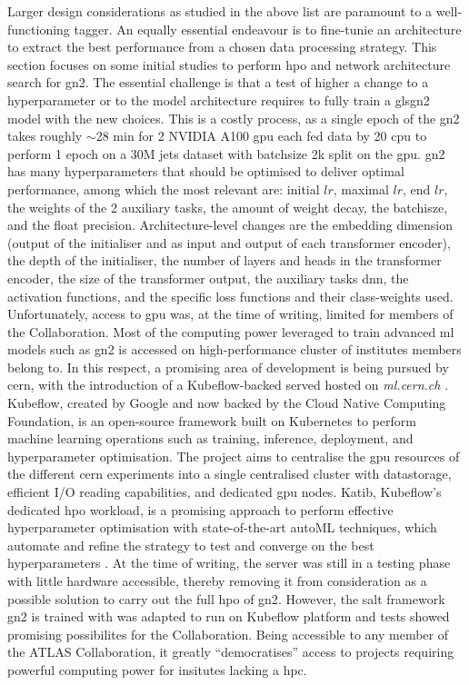 Larger design considerations as studied in the above list are paramount to a well-functioning tagger. An equally essential endeavour is to fine-tunie an architecture to extract the best performance from a chosen data processing strategy. This section focuses on some initial studies to perform \gls{hpo} and network architecture search for \gls{gn2}. The essential challenge is that a test of higher a change to a hyperparameter or to the model architecture requires to fully train a gls{gn2} model with the new choices. This is a costly process, as a single epoch of the \gls{gn2} takes roughly $\sim$28 min for 2 NVIDIA A100 \gls{gpu} each fed data by 20 \gls{cpu} to perform 1 epoch on a 30M jets dataset with batchsize 2k split on the \gls{gpu}. \gls{gn2} has many hyperparameters that should be optimised to deliver optimal performance, among which the most relevant are: initial $lr$, maximal $lr$, end $lr$, the weights of the 2 auxiliary tasks, the amount of weight decay, the batchisze, and the float precision. Architecture-level changes are the embedding dimension (output of the initialiser and as input and output of each transformer encoder), the depth of the initialiser, the number of layers and heads in the transformer encoder, the size of the transformer output, the auxiliary tasks \gls{dnn}, the activation functions, and the specific loss functions and their class-weights used. \\

Unfortunately, access to \gls{gpu} was, at the time of writing, limited for members of the Collaboration. Most of the computing power leveraged to train advanced \gls{ml} models such as \gls{gn2} is accessed on high-performance cluster of institutes members belong to. In this respect, a promising area of development is being pursued by \gls{cern}, with the introduction of a Kubeflow-backed served hosted on \textit{ml.cern.ch} \cite{KubeflowCern}. Kubeflow, created by Google and now backed by the Cloud Native Computing Foundation, is an open-source framework built on Kubernetes to perform machine learning operations such as training, inference, deployment, and hyperparameter optimisation. The project aims to centralise the \gls{gpu} resources of the different \gls{cern} experiments into a single centralised cluster with datastorage, efficient I/O reading capabilities, and dedicated \gls{gpu} nodes. Katib, Kubeflow's dedicated \gls{hpo} workload, is a promising approach to perform effective hyperparameter optimisation with state-of-the-art autoML techniques, which automate and refine the strategy to test and converge on the best hyperparameters \cite{george2020katib}. At the time of writing, the server was still in a testing phase with little hardware accessible, thereby removing it from consideration as a possible solution to carry out the full \gls{hpo} of \gls{gn2}. However, the salt framework \gls{gn2} is trained with was adapted to run on Kubeflow platform and tests showed promising possibilites for the Collaboration. Being accessible to any member of the ATLAS Collaboration, it greatly ``democratises'' access to projects requiring powerful computing power for insitutes lacking a \gls{hpc}. \\


